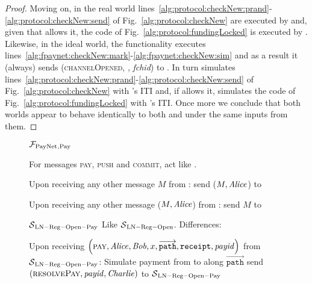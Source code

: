 \begin{proof}
    Moving on, in the real world
    lines~\ref{alg:protocol:checkNew:prand}-\ref{alg:protocol:checkNew:send} of
    Fig.~\ref{alg:protocol:checkNew} are executed by \alice{} and, given that
    \adversary{} allows it, the code of Fig.~\ref{alg:protocol:fundingLocked} is
    executed by \bob. Likewise, in the ideal world, the functionality executes
    lines~\ref{alg:fpaynet:checkNew:mark}-\ref{alg:fpaynet:checkNew:sim} and as
    a result it (always) sends (\textsc{channelOpened}, \alice, \textit{fchid})
    to \simulator. In turn \simulator{} simulates
    lines~\ref{alg:protocol:checkNew:prand}-\ref{alg:protocol:checkNew:send} of
    Fig.~\ref{alg:protocol:checkNew} with \alice's ITI and, if \adversary{}
    allows it, \simulator{} simulates the code of
    Fig.~\ref{alg:protocol:fundingLocked} with \bob's ITI. Once more we conclude
    that both worlds appear to behave identically to both \environment{} and
    \adversary{} under the same inputs from them.
  \end{proof}

  \begin{figure}[H]
    \begin{systembox}{$\mathcal{F}_{\mathrm{PayNet}}{}_{\mathrm{, Pay}}$}
      \begin{algorithmic}[1]
        \State For messages \textsc{pay}, \textsc{push} and \textsc{commit}, act
        like \fpaynet{}.
        \Statex

        \State Upon receiving any other message $M$ from \alice:
        \Indent
            \State send ($M, \mathit{Alice}$) to \simulator
          \EndIf
        \EndIndent
        \Statex

        \State Upon receiving any other message ($M, \mathit{Alice}$) from \simulator:
        \Indent
            \State send $M$ to \alice
          \EndIf
        \EndIndent
      \end{algorithmic}
    \end{systembox}
    \caption{}
    \label{alg:proof:fpaynet:pay}
  \end{figure}

  \begin{figure}[H]
    \begin{simulatorbox}{$\mathcal{S}{}_{\mathrm{LN - Reg - Open - Pay}}$}
      Like $\mathcal{S}{}_{\mathrm{LN - Reg - Open}}$. Differences:
      \begin{algorithmic}[1]
        \State Upon receiving $\left(\textsc{pay}, \mathit{Alice}, \mathit{Bob}, x,
        \overrightarrow{\mathtt{path}}, \mathtt{receipt}, \mathit{payid}\right)$
        from $\mathcal{S}{}_{\mathrm{LN - Reg - Open - Pay}}$:
        \Indent
          \State Simulate payment from \alice{} to \bob{} along
          $\overrightarrow{\mathtt{path}}$ 
          \State send $\left(\textsc{resolvePay}, \mathit{payid},
          \mathit{Charlie}\right)$ to $\mathcal{S}{}_{\mathrm{LN - Reg - Open - Pay}}$
        \EndIndent
      \end{algorithmic}
    \end{simulatorbox}
    \caption{}
    \label{alg:sim:pay}
  \end{figure}

